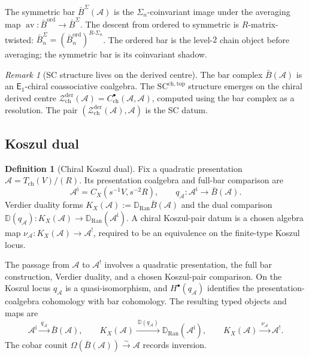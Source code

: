 \documentclass[11pt,reqno]{amsart}
\theoremstyle{definition}
\newtheorem{definition}[theorem]{Definition}
\theoremstyle{remark}
\newtheorem{remark}[theorem]{Remark}
\newcommand{\cA}{\mathcal{A}}
\newcommand{\cZ}{\mathcal{Z}}
\newcommand{\Ran}{\mathrm{Ran}}
\newcommand{\Eone}{\mathsf{E}_{1}}
\newcommand{\SCchtop}{\mathrm{SC}^{\mathrm{ch,top}}}
\newcommand{\barB}{\bar{B}}
\DeclareMathOperator{\av}{av}
\numberwithin{equation}{section}
\begin{document}
The symmetric bar $\barB^{\Sigma}(\cA)$ is the
$\Sigma_n$-coinvariant image under the averaging map
$\av \colon \barB^{\mathrm{ord}} \to \barB^{\Sigma}$. The
descent from ordered to symmetric is $R$-matrix-twisted:
$\barB^{\Sigma}_n = (\barB^{\mathrm{ord}}_n)^{R\text{-}\Sigma_n}$.
The ordered bar is the level-$2$ chain object before averaging; the symmetric bar is
its coinvariant shadow.

\begin{remark}[SC structure lives on the derived centre]
\label{rem:bar-not-sc}
The bar complex $\barB(\cA)$ is an $\Eone$-chiral coassociative
coalgebra. The $\SCchtop$ structure emerges on the chiral derived centre
$\cZ^{\mathrm{der}}_{\mathrm{ch}}(\cA) =
C^\bullet_{\mathrm{ch}}(\cA,\cA)$, computed using the bar complex
as a resolution. The pair
$(\cZ^{\mathrm{der}}_{\mathrm{ch}}(\cA), \cA)$ is the SC datum.
\end{remark}


\subsection{Koszul dual}\label{subsec:koszul-dual}

\begin{definition}[Chiral Koszul dual]\label{def:koszul-dual}
Fix a quadratic presentation
$\cA=T_{\mathrm{ch}}(V)/(R)$.  Its presentation coalgebra and full-bar
comparison are
\begin{equation}\label{eq:kd}
\cA^{\mathrm i}=C_X(s^{-1}V,s^{-2}R),
\qquad
q_\cA\colon\cA^{\mathrm i}\longrightarrow\barB(\cA).
\end{equation}
Verdier duality forms
$K_X(\cA):=\mathbb D_{\Ran}\barB(\cA)$ and the dual comparison
$\mathbb D(q_\cA)\colon K_X(\cA)\to
\mathbb D_{\Ran}(\cA^{\mathrm i})$.  A chiral Koszul-pair datum is a
chosen algebra map
$\nu_\cA\colon K_X(\cA)\to\cA^!$, required to be an equivalence on
the finite-type Koszul locus.
\end{definition}

The passage from $\cA$ to $\cA^!$ involves a quadratic presentation,
the full bar construction, Verdier duality, and a chosen Koszul-pair
comparison.  On the Koszul locus $q_\cA$ is a quasi-isomorphism, and
$H^\bullet(q_\cA)$ identifies the presentation-coalgebra cohomology
with bar cohomology.  The resulting typed objects and maps are
\begin{equation}\label{eq:four-objects}
\cA^{\mathrm i}\xrightarrow{\ q_\cA\ }\barB(\cA),
\qquad
K_X(\cA)\xrightarrow{\ \mathbb D(q_\cA)\ }
\mathbb D_{\Ran}(\cA^{\mathrm i}),
\qquad
K_X(\cA)\xrightarrow{\ \nu_\cA\ }\cA^!.
\end{equation}
The cobar counit
$\Omega(\barB(\cA))\xrightarrow{\sim}\cA$ records inversion.
\end{document}
